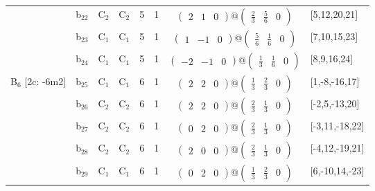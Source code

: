 \documentclass[fleqn,10pt,landscape]{article}
\begin{document}
\begin{itemize}
\begin{center}
\begin{longtable}{cc|cc|c|c|c|l}
& b$_{22}$ & C$_{2}$ & C$_{2}$ & 5 & 1 & $\begin{pmatrix} 2 & 1 & 0 \end{pmatrix}@\begin{pmatrix} \frac{2}{3} & \frac{5}{6} & 0 \end{pmatrix}$ & [5,12,20,21] \\
& b$_{23}$ & C$_{1}$ & C$_{1}$ & 5 & 1 & $\begin{pmatrix} 1 & -1 & 0 \end{pmatrix}@\begin{pmatrix} \frac{5}{6} & \frac{1}{6} & 0 \end{pmatrix}$ & [7,10,15,23] \\
& b$_{24}$ & C$_{1}$ & C$_{1}$ & 5 & 1 & $\begin{pmatrix} -2 & -1 & 0 \end{pmatrix}@\begin{pmatrix} \frac{1}{3} & \frac{1}{6} & 0 \end{pmatrix}$ & [8,9,16,24] \\ \hline
B$_{6}$ [2c: -6m2] & b$_{25}$ & C$_{1}$ & C$_{1}$ & 6 & 1 & $\begin{pmatrix} 2 & 2 & 0 \end{pmatrix}@\begin{pmatrix} \frac{1}{3} & \frac{2}{3} & 0 \end{pmatrix}$ & [1,-8,-16,17] \\
& b$_{26}$ & C$_{2}$ & C$_{2}$ & 6 & 1 & $\begin{pmatrix} 2 & 2 & 0 \end{pmatrix}@\begin{pmatrix} \frac{2}{3} & \frac{1}{3} & 0 \end{pmatrix}$ & [-2,5,-13,20] \\
& b$_{27}$ & C$_{2}$ & C$_{2}$ & 6 & 1 & $\begin{pmatrix} 0 & 2 & 0 \end{pmatrix}@\begin{pmatrix} \frac{2}{3} & \frac{1}{3} & 0 \end{pmatrix}$ & [-3,11,-18,22] \\
& b$_{28}$ & C$_{2}$ & C$_{2}$ & 6 & 1 & $\begin{pmatrix} 2 & 0 & 0 \end{pmatrix}@\begin{pmatrix} \frac{2}{3} & \frac{1}{3} & 0 \end{pmatrix}$ & [-4,12,-19,21] \\
& b$_{29}$ & C$_{1}$ & C$_{1}$ & 6 & 1 & $\begin{pmatrix} 0 & 2 & 0 \end{pmatrix}@\begin{pmatrix} \frac{1}{3} & \frac{2}{3} & 0 \end{pmatrix}$ & [6,-10,14,-23] \\

\end{longtable}
\end{center}
\end{itemize}
\end{document}
